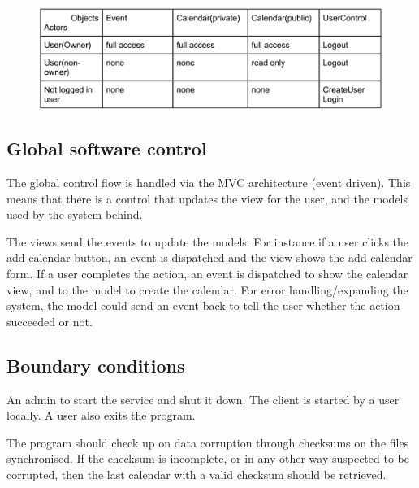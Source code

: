 \documentclass[10pt]{report}
\numberwithin{equation}{section} %
\numberwithin{figure}{section} %
\numberwithin{table}{section} %
\begin{document}
\begin{figure}[H]
  \includegraphics[scale=0.7]{figures/accesscontrol.png}
\end{figure}

\subsection{Global software control}
The global control flow is handled via the MVC architecture (event driven). This
means that there is a control that updates the view for the user, and the models
used by the system behind.

The views send the events to update the models. For instance if a user
clicks the add calendar button, an event is dispatched and the view shows the
add calendar form. If a user completes the action, an event is dispatched to
show the calendar view, and to the model to create the calendar. For error
handling/expanding the system, the model could send an event back to tell the
user whether the action succeeded or not.

\subsection{Boundary conditions}
An admin to start the service and shut it down.
The client is started by a user locally.
A user also exits the program.

The program should check up on data corruption through checksums on the files
synchronised. If the checksum is incomplete, or in any other way suspected to be
corrupted, then the last calendar with a valid checksum should be retrieved.
\end{document}
